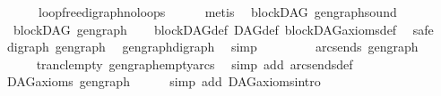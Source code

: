 \begin{isabellebody}
\ \ \ \ \ \ loopfree{\isacharunderscore}{\kern0pt}digraph{\isachardot}{\kern0pt}no{\isacharunderscore}{\kern0pt}loops\isanewline
\ \ \ \ \isamarkupfalse%
\ metis\isanewline
{}\isamarkupfalse%
%
\endisatagproof
{\isafoldproof}%
%
\isadelimproof
\isanewline
%
\endisadelimproof
\isanewline
\isanewline
{}\isamarkupfalse%
\ {\isacharparenleft}{\kern0pt}\ blockDAG{\isacharparenright}{\kern0pt}\ gen{\isacharunderscore}{\kern0pt}graph{\isacharunderscore}{\kern0pt}sound{\isacharcolon}{\kern0pt}\ \isanewline
\ \ {\isachardoublequoteopen}blockDAG\ {\isacharparenleft}{\kern0pt}gen{\isacharunderscore}{\kern0pt}graph{\isacharparenright}{\kern0pt}{\isachardoublequoteclose}\isanewline
%
\isadelimproof
\ \ %
\endisadelimproof
%
\isatagproof
{}\isamarkupfalse%
\ blockDAG{\isacharunderscore}{\kern0pt}def\ DAG{\isacharunderscore}{\kern0pt}def\ blockDAG{\isacharunderscore}{\kern0pt}axioms{\isacharunderscore}{\kern0pt}def\ \isanewline
{}\isamarkupfalse%
\ safe\isanewline
\ \ \isamarkupfalse%
\ {\isachardoublequoteopen}digraph\ gen{\isacharunderscore}{\kern0pt}graph{\isachardoublequoteclose}\ \isamarkupfalse%
\ gen{\isacharunderscore}{\kern0pt}graph{\isacharunderscore}{\kern0pt}digraph\ \isamarkupfalse%
\ simp\ \ \ \ \ \isanewline
{}\isamarkupfalse%
\isanewline
\ \ \isamarkupfalse%
\ {\isachardoublequoteopen}{\isacharparenleft}{\kern0pt}arcs{\isacharunderscore}{\kern0pt}ends\ gen{\isacharunderscore}{\kern0pt}graph{\isacharparenright}{\kern0pt}\isactrlsup {\isacharplus}{\kern0pt}\ {\isacharequal}{\kern0pt}\ {\isacharbraceleft}{\kern0pt}{\isacharbraceright}{\kern0pt}{\isachardoublequoteclose}\isanewline
\ \ \ \ \isamarkupfalse%
\ trancl{\isacharunderscore}{\kern0pt}empty\ gen{\isacharunderscore}{\kern0pt}graph{\isacharunderscore}{\kern0pt}empty{\isacharunderscore}{\kern0pt}arcs\ \isamarkupfalse%
\ {\isacharparenleft}{\kern0pt}simp\ add{\isacharcolon}{\kern0pt}\ arcs{\isacharunderscore}{\kern0pt}ends{\isacharunderscore}{\kern0pt}def{\isacharparenright}{\kern0pt}\ \isanewline
\ \ \isamarkupfalse%
\ \isamarkupfalse%
\ {\isachardoublequoteopen}DAG{\isacharunderscore}{\kern0pt}axioms\ gen{\isacharunderscore}{\kern0pt}graph{\isachardoublequoteclose}\isanewline
\ \ \ \ \isamarkupfalse%
\ {\isacharparenleft}{\kern0pt}simp\ add{\isacharcolon}{\kern0pt}\ DAG{\isacharunderscore}{\kern0pt}axioms{\isachardot}{\kern0pt}intro{\isacharparenright}{\kern0pt}\ \isanewline

\end{isabellebody}
